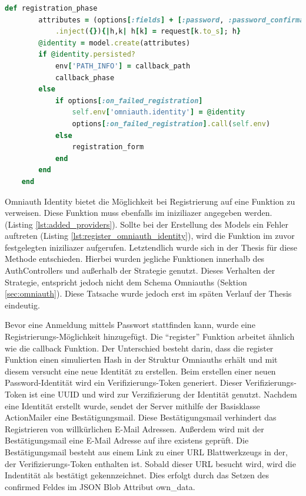 \documentclass[paper=a4,fontsize=12pt,parskip=half]{scrartcl}
\begin{document}
\begin{description}
		\begin{lstlisting}[language=Ruby, style=CodeView, caption=Aufgerufene Funktion bei POST Request (Omniauth Identity), captionpos=b, label={lst:register_omniauth_identity}]
	def registration_phase
		attributes = (options[:fields] + [:password, :password_confirmation])
			.inject({}){|h,k| h[k] = request[k.to_s]; h}
		@identity = model.create(attributes)
		if @identity.persisted?
			env['PATH_INFO'] = callback_path
			callback_phase
		else
			if options[:on_failed_registration]
				self.env['omniauth.identity'] = @identity
				options[:on_failed_registration].call(self.env)
			else
				registration_form
			end
		end
	end
		\end{lstlisting}
		Omniauth Identity bietet die Möglichkeit bei Registrierung auf eine Funktion zu verweisen. Diese Funktion muss ebenfalls im iniziliazer angegeben werden. (Listing \ref{lst:added_providers}). Sollte bei der Erstellung des Models ein Fehler auftreten (Listing \ref{lst:register_omniauth_identity}), wird die Funktion im zuvor festgelegten iniziliazer aufgerufen. Letztendlich wurde sich in der Thesis für diese Methode entschieden. Hierbei wurden jegliche Funktionen innerhalb des AuthControllers und außerhalb der Strategie genutzt. Dieses Verhalten der Strategie, entspricht jedoch nicht dem Schema Omniauths (Sektion \ref{sec:omniauth}). Diese Tatsache wurde jedoch erst im späten Verlauf der Thesis eindeutig.

		Bevor eine Anmeldung mittels Passwort stattfinden kann, wurde eine Registrierungs-Möglichkeit hinzugefügt. Die \enquote{register} Funktion arbeitet ähnlich wie die callback Funktion. Der Unterschied besteht darin, dass die register Funktion einen simulierten Hash in der Struktur Omniauths erhält und mit diesem versucht eine neue Identität zu erstellen. Beim erstellen einer neuen Password-Identität wird ein Verifizierungs-Token generiert. Dieser Verifizierungs-Token ist eine \gls{UUID} und wird zur Verzifizierung der Identität genutzt. Nachdem eine Identität erstellt wurde, sendet der Server mithilfe der Basisklasse ActionMailer eine Bestätigungsmail. Diese Bestätigungsmail verhindert das Registrieren von willkürlichen E-Mail Adressen. Außerdem wird  mit der Bestätigungsmail eine E-Mail Adresse auf ihre existens geprüft. Die Bestätigungsmail besteht aus einem Link zu einer \gls{URL} Blattwerkzeugs in der, der Verifizierungs-Token enthalten ist. Sobald dieser \gls{URL} besucht wird, wird die Indentität als bestätigt gekennzeichnet. Dies erfolgt durch das Setzen des confirmed Feldes im JSON Blob Attribut own\_data.


\end{description}
\end{document}
